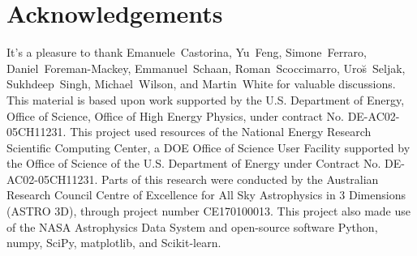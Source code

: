 \documentclass[12pt, letterpaper, preprint]{aastex}
\begin{document}
\section*{Acknowledgements}
It's a pleasure to thank 
    Emanuele~Castorina,
    Yu~Feng, 
    Simone~Ferraro,
    Daniel~Foreman-Mackey, 
    Emmanuel~Schaan, 
    Roman~Scoccimarro,
    Uro{\u s}~Seljak,
    Sukhdeep~Singh, 
    Michael~Wilson, 
    and Martin~White
for valuable discussions.
This material is based upon work supported by the U.S. Department 
of Energy, Office of Science, Office of High Energy Physics, under 
contract No. DE-AC02-05CH11231.
This project used resources of the National Energy Research 
Scientific Computing Center, a DOE Office of Science User 
Facility supported by the Office of Science of the U.S. 
Department of Energy under Contract No. DE-AC02-05CH11231.
Parts of this research were conducted by the Australian Research Council
Centre of Excellence for All Sky Astrophysics in 3 Dimensions (ASTRO 3D),
through project number CE170100013.
This project also made use of the NASA Astrophysics Data 
System and open-source software Python, numpy, SciPy, matplotlib, 
and Scikit-learn. 



\end{document}
